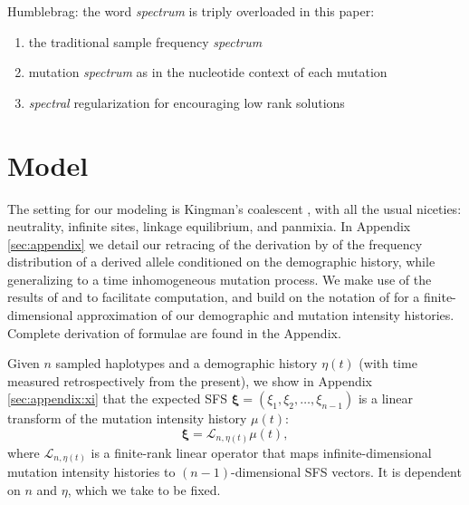 \documentclass[11pt]{article}
\begin{document}

Humblebrag: the word \emph{spectrum} is triply overloaded in this paper:
\begin{enumerate}
\item the traditional sample frequency \emph{spectrum}
\item mutation \emph{spectrum} as in the nucleotide context of each mutation
\item \emph{spectral} regularization for encouraging low rank solutions
\end{enumerate}

\section*{Model}\label{sec:model}

The setting for our modeling is Kingman's coalescent \citep{Kingman1982-ge, Kingman1982-tf, Kingman1982-ys, Kingman2000-jr}, with all the usual niceties: neutrality, infinite sites, linkage equilibrium, and panmixia.
In Appendix \ref{sec:appendix} we detail our retracing of the derivation by \cite{Griffiths1998-qf} of the frequency distribution of a derived allele conditioned on the demographic history, while generalizing to a time inhomogeneous mutation process.
We make use of the results of \cite{Polanski2003-kg} and \cite{Polanski2003-ll} to facilitate computation, and build on the notation of \cite{Rosen2018-bb} for a finite-dimensional approximation of our demographic and mutation intensity histories.
Complete derivation of formulae are found in the Appendix.

Given $n$ sampled haplotypes and a demographic history $\eta(t)$ (with time measured retrospectively from the present), we show in Appendix \ref{sec:appendix:xi} that the expected SFS $\boldsymbol \xi = (\xi_1, \xi_2,\dots, \xi_{n-1})$ is a linear transform of the mutation intensity history $\mu(t)$:
\begin{equation}
  \label{eqn:transform}
\boldsymbol \xi = \mathcal{L}_{n,\eta(t)}\mu(t),
\end{equation}
where $\mathcal{L}_{n,\eta(t)}$ is a finite-rank linear operator that maps infinite-dimensional mutation intensity histories to $(n-1)$-dimensional SFS vectors.
It is dependent on $n$ and $\eta$, which we take to be fixed.

\end{document}
